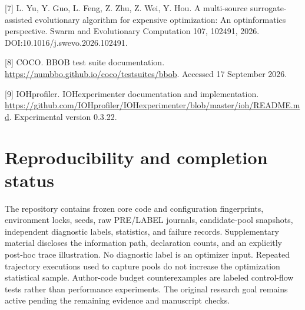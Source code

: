 \documentclass[11pt,a4paper]{article}
\begin{document}
{[}7{]} L. Yu, Y. Guo, L. Feng, Z. Zhu, Z. Wei, Y. Hou. A multi-source
surrogate-assisted evolutionary algorithm for expensive optimization: An
optinformatics perspective. Swarm and Evolutionary Computation 107,
102491, 2026. DOI:10.1016/j.swevo.2026.102491.

{[}8{]} COCO. BBOB test suite documentation.
\url{https://numbbo.github.io/coco/testsuites/bbob}. Accessed 17
September 2026.

{[}9{]} IOHprofiler. IOHexperimenter documentation and implementation.
\url{https://github.com/IOHprofiler/IOHexperimenter/blob/master/ioh/README.md}.
Experimental version 0.3.22.

\hypertarget{reproducibility-and-completion-status}{%
\section{Reproducibility and completion
status}\label{reproducibility-and-completion-status}}

The repository contains frozen core code and configuration fingerprints,
environment locks, seeds, raw PRE/LABEL journals, candidate-pool
snapshots, independent diagnostic labels, statistics, and failure
records. Supplementary material discloses the information path,
declaration counts, and an explicitly post-hoc trace illustration. No
diagnostic label is an optimizer input. Repeated trajectory executions
used to capture pools do not increase the optimization statistical
sample. Author-code budget counterexamples are labeled control-flow
tests rather than performance experiments. The original research goal
remains active pending the remaining evidence and manuscript checks.
\end{document}
